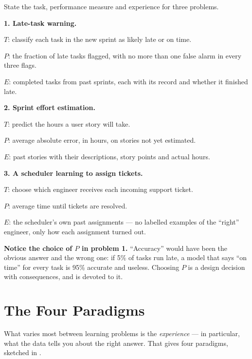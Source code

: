 \begin{worked}
State the task, performance measure and experience for three problems.

\smallskip
\textbf{1. Late-task warning.}
\begin{tight}
  \item $T$: classify each task in the new sprint as likely late or on time.
  \item $P$: the fraction of late tasks flagged, with no more than one false alarm
        in every three flags.
  \item $E$: completed tasks from past sprints, each with its record and whether
        it finished late.
\end{tight}

\textbf{2. Sprint effort estimation.}
\begin{tight}
  \item $T$: predict the hours a user story will take.
  \item $P$: average absolute error, in hours, on stories not yet estimated.
  \item $E$: past stories with their descriptions, story points and actual hours.
\end{tight}

\textbf{3. A scheduler learning to assign tickets.}
\begin{tight}
  \item $T$: choose which engineer receives each incoming support ticket.
  \item $P$: average time until tickets are resolved.
  \item $E$: the scheduler's own past assignments --- no labelled examples of the
        ``right'' engineer, only how each assignment turned out.
\end{tight}

\smallskip
\textbf{Notice the choice of $P$ in problem 1.} ``Accuracy'' would have been the
obvious answer and the wrong one: if 5\% of tasks run late, a model that says
``on time'' for every task is 95\% accurate and useless. Choosing $P$ is a design
decision with consequences, and  is devoted to it.
\end{worked}

\section{The Four Paradigms}

What varies most between learning problems is the \emph{experience} --- in
particular, what the data tells you about the right answer. That gives four
paradigms, sketched in .

